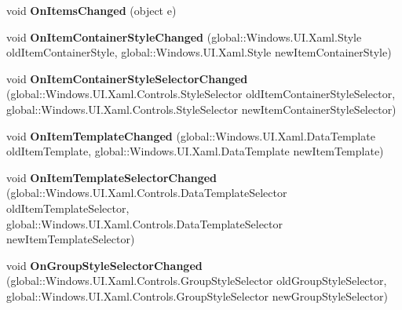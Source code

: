 \begin{DoxyCompactItemize}
void {\bfseries On\+Items\+Changed} (object e)
\item 
\mbox{\label{interface_windows_1_1_u_i_1_1_xaml_1_1_controls_1_1_i_items_control_overrides_aec19844110896dfbbe9fb5a9ddea5cea}} 
void {\bfseries On\+Item\+Container\+Style\+Changed} (global\+::\+Windows.\+U\+I.\+Xaml.\+Style old\+Item\+Container\+Style, global\+::\+Windows.\+U\+I.\+Xaml.\+Style new\+Item\+Container\+Style)
\item 
\mbox{\label{interface_windows_1_1_u_i_1_1_xaml_1_1_controls_1_1_i_items_control_overrides_a4d197dd9f2dbb42d5ba7828014c6d966}} 
void {\bfseries On\+Item\+Container\+Style\+Selector\+Changed} (global\+::\+Windows.\+U\+I.\+Xaml.\+Controls.\+Style\+Selector old\+Item\+Container\+Style\+Selector, global\+::\+Windows.\+U\+I.\+Xaml.\+Controls.\+Style\+Selector new\+Item\+Container\+Style\+Selector)
\item 
\mbox{\label{interface_windows_1_1_u_i_1_1_xaml_1_1_controls_1_1_i_items_control_overrides_ac592214833c559a28551ba9ccb0b4d2a}} 
void {\bfseries On\+Item\+Template\+Changed} (global\+::\+Windows.\+U\+I.\+Xaml.\+Data\+Template old\+Item\+Template, global\+::\+Windows.\+U\+I.\+Xaml.\+Data\+Template new\+Item\+Template)
\item 
\mbox{\label{interface_windows_1_1_u_i_1_1_xaml_1_1_controls_1_1_i_items_control_overrides_a30660077603ff4ebf8b8f749780afbd1}} 
void {\bfseries On\+Item\+Template\+Selector\+Changed} (global\+::\+Windows.\+U\+I.\+Xaml.\+Controls.\+Data\+Template\+Selector old\+Item\+Template\+Selector, global\+::\+Windows.\+U\+I.\+Xaml.\+Controls.\+Data\+Template\+Selector new\+Item\+Template\+Selector)
\item 
\mbox{\label{interface_windows_1_1_u_i_1_1_xaml_1_1_controls_1_1_i_items_control_overrides_ac04335f529637477b2da0ba46ef61142}} 
void {\bfseries On\+Group\+Style\+Selector\+Changed} (global\+::\+Windows.\+U\+I.\+Xaml.\+Controls.\+Group\+Style\+Selector old\+Group\+Style\+Selector, global\+::\+Windows.\+U\+I.\+Xaml.\+Controls.\+Group\+Style\+Selector new\+Group\+Style\+Selector)

\end{DoxyCompactItemize}
